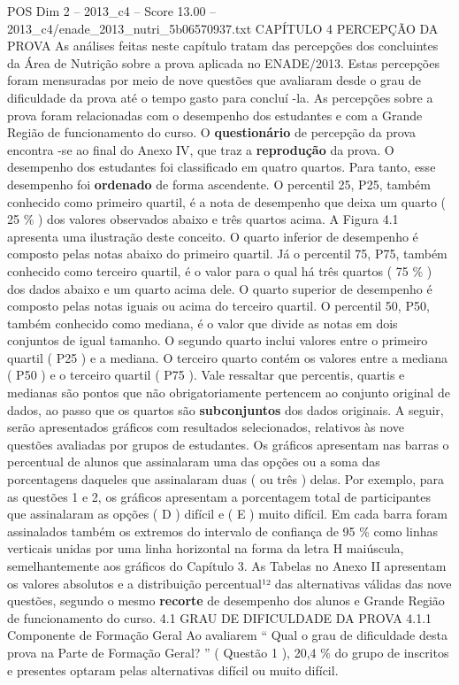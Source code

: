 \begin{textsample}{POS Dim 2 – 2013\_c4 – Score 13.00 – 2013\_c4/enade\_2013\_nutri\_5b06570937.txt}  \label{ex:f2_pos_062}
CAPÍTULO 4 PERCEPÇÃO DA PROVA As análises feitas neste capítulo tratam das percepções dos concluintes da Área de Nutrição sobre a prova aplicada no ENADE/2013.
Estas percepções foram mensuradas por meio de nove questões que avaliaram desde o grau de dificuldade da prova até o tempo gasto para concluí -la.
As percepções sobre a prova foram relacionadas com o desempenho dos estudantes e com a Grande Região de funcionamento do curso.
O \textbf{questionário} de percepção da prova encontra -se ao final do Anexo IV, que traz a \textbf{reprodução} da prova.
O desempenho dos estudantes foi classificado em quatro quartos.
Para tanto, esse desempenho foi \textbf{ordenado} de forma ascendente.
O percentil 25, P25, também conhecido como primeiro quartil, é a nota de desempenho que deixa um quarto ( 25 \% ) dos valores observados abaixo e três quartos acima.
A Figura 4.1 apresenta uma ilustração deste conceito.
O quarto inferior de desempenho é composto pelas notas abaixo do primeiro quartil.
Já o percentil 75, P75, também conhecido como terceiro quartil, é o valor para o qual há três quartos ( 75 \% ) dos dados abaixo e um quarto acima dele.
O quarto superior de desempenho é composto pelas notas iguais ou acima do terceiro quartil.
O percentil 50, P50, também conhecido como mediana, é o valor que divide as notas em dois conjuntos de igual tamanho.
O segundo quarto inclui valores entre o primeiro quartil ( P25 ) e a mediana.
O terceiro quarto contém os valores entre a mediana ( P50 ) e o terceiro quartil ( P75 ).
Vale ressaltar que percentis, quartis e medianas são pontos que não obrigatoriamente pertencem ao conjunto original de dados, ao passo que os quartos são \textbf{subconjuntos} dos dados originais.
A seguir, serão apresentados gráficos com resultados selecionados, relativos às nove questões avaliadas por grupos de estudantes.
Os gráficos apresentam nas barras o percentual de alunos que assinalaram uma das opções ou a soma das porcentagens daqueles que assinalaram duas ( ou três ) delas.
Por exemplo, para as questões 1 e 2, os gráficos apresentam a porcentagem total de participantes que assinalaram as opções ( D ) difícil e ( E ) muito difícil.
Em cada barra foram assinalados também os extremos do intervalo de confiança de 95 \% como linhas verticais unidas por uma linha horizontal na forma da letra H maiúscula, semelhantemente aos gráficos do Capítulo 3.
As Tabelas no Anexo II apresentam os valores absolutos e a distribuição percentual¹² das alternativas válidas das nove questões, segundo o mesmo \textbf{recorte} de desempenho dos alunos e Grande Região de funcionamento do curso. 4.1 GRAU DE DIFICULDADE DA PROVA 4.1.1 Componente de Formação Geral Ao avaliarem “ Qual o grau de dificuldade desta prova na Parte de Formação Geral? ” ( Questão 1 ), 20,4 \% do grupo de inscritos e presentes optaram pelas alternativas difícil ou muito difícil.

\end{textsample}
